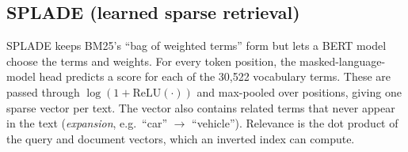 \subsection{SPLADE (learned sparse retrieval)~\cite{formal2021splade,formal2021spladev2}}
SPLADE keeps BM25's ``bag of weighted terms'' form but lets a BERT model choose the terms and
weights. For every token position, the masked-language-model head predicts a score for each of
the 30,522 vocabulary terms. These are passed through $\log(1+\mathrm{ReLU}(\cdot))$ and max-pooled
over positions, giving one sparse vector per text. The vector also contains related terms that
never appear in the text (\emph{expansion}, e.g.\ ``car'' $\to$ ``vehicle''). Relevance is the dot
product of the query and document vectors, which an inverted index can compute.
\begin{center}\end{center}

